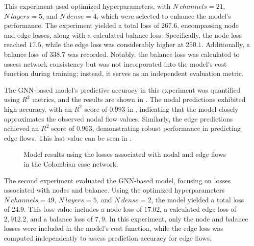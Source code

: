 This experiment used optimized hyperparameters, with \( N \ channels = 21 \), \( N \ layers = 5 \), and \( N \ dense = 4 \), which were selected to enhance the model's performance. The experiment yielded a total loss of \( 267.6 \), encompassing node and edge losses, along with a calculated balance loss. Specifically, the node loss reached \( 17.5 \), while the edge loss was considerably higher at \( 250.1 \). Additionally, a balance loss of \( 338.7 \) was recorded. Notably, the balance loss was calculated to assess network consistency but was not incorporated into the model's cost function during training; instead, it serves as an independent evaluation metric. 


The GNN-based model's predictive accuracy in this experiment was quantified using \( R^2 \) metrics, and the results are shown in . The nodal predictions exhibited high accuracy, with an \( R^2 \) score of \( 0.993 \) in , indicating that the model closely approximates the observed nodal flow values. Similarly, the edge predictions achieved an \( R^2 \) score of \( 0.963 \), demonstrating robust performance in predicting edge flows. This last value can be seen in .


\begin{figure}[htbp]
    \centering
    \setlength{}        
    \setlength{} 
    
    \caption{Model results using the losses associated with nodal and edge flows in the Colombian case network.}
    \label{fig:col_base_f_results_non_lineal}
\end{figure}


The second experiment evaluated the GNN-based model, focusing on losses associated with nodes and balance. Using the optimized hyperparameters \( N \ channels = 49 \), \( N \ layers = 5 \), and \( N \ dense = 2 \), the model yielded a total loss of \( 24.9 \). This loss value includes a node loss of \( 17.02 \), a calculated edge loss of \( 2,912.2 \), and a balance loss of \( 7,9 \). In this experiment, only the node and balance losses were included in the model's cost function, while the edge loss was computed independently to assess prediction accuracy for edge flows.


